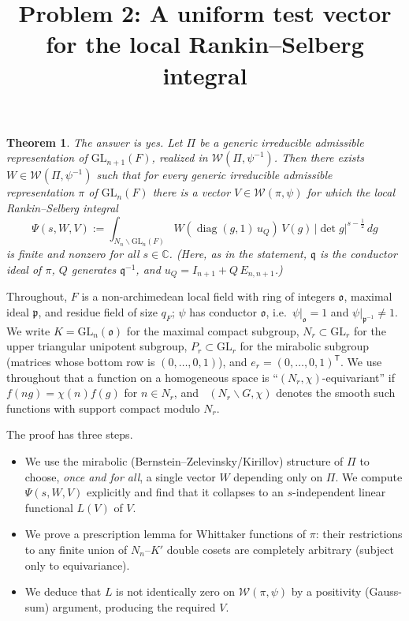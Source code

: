 \documentclass[12pt]{article}
\title{Problem 2: A uniform test vector for the local Rankin--Selberg integral}
\author{}
\date{}
\newcommand{\GL}{\mathrm{GL}}
\newcommand{\oo}{\mathfrak{o}}
\newcommand{\pp}{\mathfrak{p}}
\newcommand{\qq}{\mathfrak{q}}
\newcommand{\Wmod}{\mathcal{W}}
\newcommand{\diag}{\operatorname{diag}}
\DeclareMathOperator{\Cc}{C_c^\infty}
\newtheorem{theorem}{Theorem}
\begin{document}
\maketitle

\begin{theorem}
The answer is \emph{yes}. Let $\Pi$ be a generic irreducible admissible
representation of $\GL_{n+1}(F)$, realized in $\Wmod(\Pi,\psi^{-1})$. Then there
exists $W\in\Wmod(\Pi,\psi^{-1})$ such that for every generic irreducible
admissible representation $\pi$ of $\GL_n(F)$ there is a vector
$V\in\Wmod(\pi,\psi)$ for which the local Rankin--Selberg integral
\[
  \Psi(s,W,V):=\int_{N_n\backslash \GL_n(F)} W(\diag(g,1)\,u_Q)\,V(g)\,|\det g|^{s-\frac12}\,dg
\]
is finite and nonzero for all $s\in\mathbb C$. (Here, as in the statement,
$\qq$ is the conductor ideal of $\pi$, $Q$ generates $\qq^{-1}$, and
$u_Q=I_{n+1}+Q\,E_{n,n+1}$.)
\end{theorem}

Throughout, $F$ is a non-archimedean local field with ring of integers $\oo$,
maximal ideal $\pp$, and residue field of size $q_F$; $\psi$ has conductor $\oo$,
i.e.\ $\psi|_{\oo}=1$ and $\psi|_{\pp^{-1}}\neq1$. We write $K=\GL_n(\oo)$ for the
maximal compact subgroup, $N_r\subset\GL_r$ for the upper triangular unipotent
subgroup, $P_r\subset\GL_r$ for the mirabolic subgroup (matrices whose bottom row
is $(0,\dots,0,1)$), and $e_r=(0,\dots,0,1)^{\mathsf T}$. We use throughout that a
function on a homogeneous space is ``$(N_r,\chi)$-equivariant'' if
$f(ng)=\chi(n)f(g)$ for $n\in N_r$, and $\Cc(N_r\backslash G,\chi)$ denotes the
smooth such functions with support compact modulo $N_r$.

The proof has three steps.
\begin{itemize}
\item[(A)] We use the mirabolic (Bernstein--Zelevinsky/Kirillov) structure of
$\Pi$ to choose, \emph{once and for all}, a single vector $W$ depending only on
$\Pi$. We compute $\Psi(s,W,V)$ explicitly and find that it collapses to an
$s$-independent linear functional $L(V)$ of $V$.
\item[(B)] We prove a prescription lemma for Whittaker functions of $\pi$: their
restrictions to any finite union of $N_n$--$K'$ double cosets are completely
arbitrary (subject only to equivariance).
\item[(C)] We deduce that $L$ is not identically zero on $\Wmod(\pi,\psi)$ by a
positivity (Gauss-sum) argument, producing the required $V$.
\end{itemize}
\end{document}
